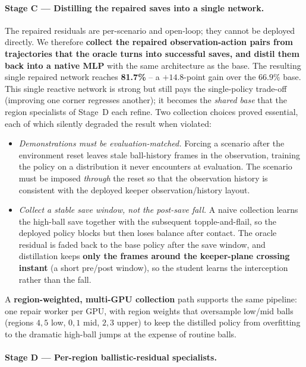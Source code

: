 \documentclass{article}
\begin{document}
\paragraph{Stage C --- Distilling the repaired saves into a single network.}

The repaired residuals are per-scenario and open-loop; they cannot be deployed
directly. We therefore \textbf{collect the repaired observation-action pairs
from trajectories that the oracle turns into successful saves, and distil them
back into a native MLP} with the same architecture as the base. The resulting
single repaired network reaches \textbf{81.7\%} -- a
$+14.8$-point gain over the $66.9\%$ base. This single reactive network is strong
but still pays the single-policy trade-off (improving one corner regresses
another); it becomes the \emph{shared base} that the region specialists of
Stage~D each refine. Two collection choices proved essential, each of which
silently degraded the result when violated:

\begin{itemize}
\item \emph{Demonstrations must be evaluation-matched.} Forcing a scenario after
the environment reset leaves stale ball-history frames in the observation,
training the policy on a distribution it never encounters at evaluation. The
scenario must be imposed \emph{through} the reset so that the observation history
is consistent with the deployed keeper observation/history layout.
\item \emph{Collect a stable save window, not the post-save fall.} A naive
collection learns the high-ball save together with the subsequent
topple-and-flail, so the deployed policy blocks but then loses balance after
contact. The oracle residual is faded back to the base policy after the save
window, and distillation keeps \textbf{only the frames around the keeper-plane
crossing instant} (a short pre/post window), so the student learns the
interception rather than the fall.
\end{itemize}

A \textbf{region-weighted, multi-GPU collection} path supports the same pipeline:
one repair worker per GPU, with region weights that oversample low/mid balls
(regions $4,5$ low, $0,1$ mid, $2,3$ upper) to keep the distilled policy from
overfitting to the dramatic high-ball jumps at the expense of routine balls.

\paragraph{Stage D --- Per-region ballistic-residual specialists.}
\end{document}
